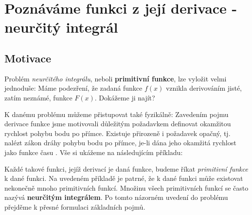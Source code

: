 \setchaptertoc
\chapter{Poznáváme funkci z její derivace - neurčitý integrál}
  \section{Motivace}
    Problém \emph{neurčitého integrálu}, neboli \textbf{primitivní funkce}, lze vyložit velmi 
    jednoduše: Máme podezření, že zadaná funkce \(f(x)\) vznikla derivováním jisté, zatím neznámé, 
    funkce \(F(x)\). Dokážeme ji najít? 
  
    K danému problému můžeme přistupovat také fyzikálně: Zavedením pojmu derivace funkce jsme 
    motivovali důležitým požadavkem definovat okamžitou rychlost pohybu bodu po přímce. Existuje 
    přirozeně i požadavek opačný, tj. nalézt zákon dráhy pohybu bodu po přímce, je-li dána jeho 
    okamžitá rychlost jako funkce času \cite[s.~253]{Brabec1989}. Vše si ukážeme na následujícím 
    příkladu:      
    
    Každé takové funkci, jejíž derivací je daná funkce, budeme říkat \emph{primitivní funkce} k 
    dané funkci. Na uvedeném příkladě je patrné, že k dané funkci může existovat nekonečně mnoho 
    primitivních funkcí. Množinu všech primitivních funkcí se často nazývá \textbf{neurčitým 
    integrálem}. Po tomto názorném uvedení do problému přejděme k přesné formulaci základních pojmů.
    

